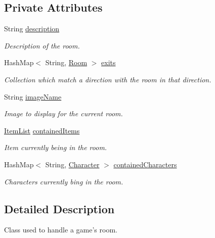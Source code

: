 \subsection*{Private Attributes}
\begin{DoxyCompactItemize}
\item 
String \hyperlink{classpkg__world_1_1Room_a029ab15b9217139d350f3a6980e49a93}{description}
\begin{DoxyCompactList}\small\item\em Description of the room. \end{DoxyCompactList}\item 
Hash\-Map$<$ String, \hyperlink{classpkg__world_1_1Room}{Room} $>$ \hyperlink{classpkg__world_1_1Room_a7ddc883b0f176f4e8a866dfb4af66167}{exits}
\begin{DoxyCompactList}\small\item\em Collection which match a direction with the room in that direction. \end{DoxyCompactList}\item 
String \hyperlink{classpkg__world_1_1Room_a5d803cae18b95d7a4fc5243fd13ae236}{image\-Name}
\begin{DoxyCompactList}\small\item\em Image to display for the current room. \end{DoxyCompactList}\item 
\hyperlink{classpkg__world_1_1pkg__items_1_1ItemList}{Item\-List} \hyperlink{classpkg__world_1_1Room_a3a9b7b85c95e41654c017e1adb74a49b}{contained\-Items}
\begin{DoxyCompactList}\small\item\em Item currently being in the room. \end{DoxyCompactList}\item 
Hash\-Map$<$ String, \hyperlink{classpkg__world_1_1pkg__characters_1_1Character}{Character} $>$ \hyperlink{classpkg__world_1_1Room_a144af7eaf591c4f5ad9eaf123e628de0}{contained\-Characters}
\begin{DoxyCompactList}\small\item\em Characters currently bing in the room. \end{DoxyCompactList}\end{DoxyCompactItemize}


\subsection{Detailed Description}
Class used to handle a game's room. 

